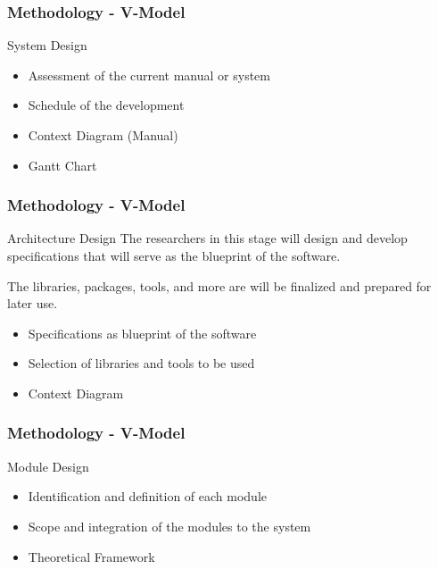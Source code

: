 \documentclass[handout]{beamer}
\begin{document}
\begin{frame}
	\frametitle{Methodology - V-Model}
	\begin{block}{System Design}
		\begin{itemize}
			\item<1-> Assessment of the current manual or system
			\item<2-> Schedule of the development
		\end{itemize}

		\begin{itemize}
			\item<3-> Context Diagram (Manual)
			\item<4-> Gantt Chart
		\end{itemize}
	\end{block}
\end{frame}

\begin{frame}
	\frametitle{Methodology - V-Model}
	\begin{block}{Architecture Design}
		The researchers in this stage will design and develop specifications that
		will serve as the blueprint of the software.

		The libraries, packages, tools, and more are will be finalized and prepared
		for later use.
		\begin{itemize}
			\item<1-> Specifications as blueprint of the software
			\item<2-> Selection of libraries and tools to be used
		\end{itemize}

		\begin{itemize}
			\item<3-> Context Diagram
		\end{itemize}
	\end{block}
\end{frame}

\begin{frame}
	\frametitle{Methodology - V-Model}
	\begin{block}{Module Design}
		\begin{itemize}
			\item<1-> Identification and definition of each module
			\item<2-> Scope and integration of the modules to the system
		\end{itemize}

		\begin{itemize}
			\item<3-> Theoretical Framework
		\end{itemize}
	\end{block}
\end{frame}
\end{document}
